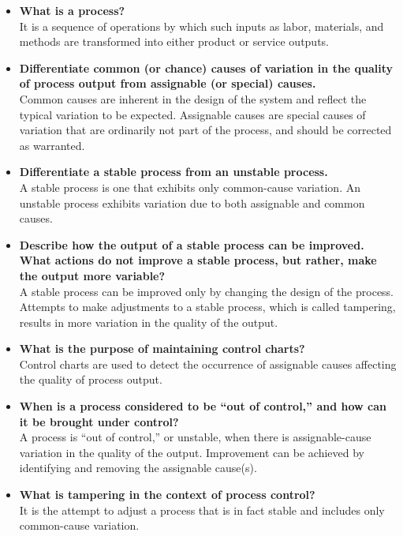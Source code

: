 \documentclass[12pt]{article}
\begin{document}
\begin{itemize}

\item \textbf{What is a process?}\\
It is a sequence of operations by which such inputs as labor, materials, and methods are transformed into
either product or service outputs.

\item \textbf{Differentiate common (or chance) causes of variation in the quality of process output from assignable
(or special) causes.}\\
Common causes are inherent in the design of the system and reflect the typical variation to be expected.
Assignable causes are special causes of variation that are ordinarily not part of the process, and should be corrected
as warranted.

\item \textbf{Differentiate a stable process from an unstable process.}\\
A stable process is one that exhibits only common-cause variation. An unstable process exhibits variation due
to both assignable and common causes.

\item \textbf{Describe how the output of a stable process can be improved. What actions do not improve a stable
process, but rather, make the output more variable?}\\
A stable process can be improved only by changing the design of the process. Attempts to make adjustments to
a stable process, which is called tampering, results in more variation in the quality of the output.

\item \textbf{What is the purpose of maintaining control charts? }\\
Control charts are used to detect the occurrence of assignable causes affecting the quality of process output.




\item \textbf{When is a process considered to be “out of control,” and how can it be brought under control?}\\
A process is “out of control,” or unstable, when there is assignable-cause variation in the quality of the
output. Improvement can be achieved by identifying and removing the assignable cause(s).

\item\textbf{ What is tampering in the context of process control?}\\
It is the attempt to adjust a process that is in fact stable and includes only common-cause variation.


\end{itemize}
\end{document}
